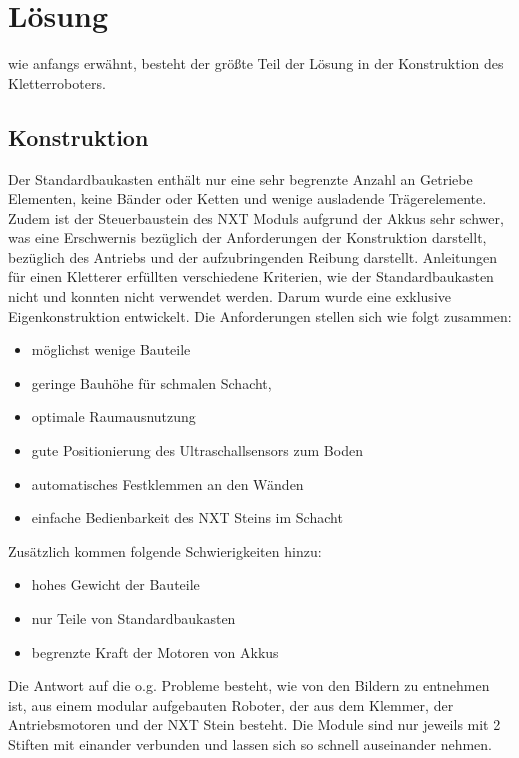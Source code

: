   \section{Lösung}
    wie anfangs erwähnt, besteht der größte Teil der Lösung in der Konstruktion des Kletterroboters.
    
    \subsection{Konstruktion}
      Der Standardbaukasten enthält nur eine sehr begrenzte Anzahl an Getriebe Elementen, keine Bänder oder Ketten und wenige ausladende Trägerelemente. Zudem ist der Steuerbaustein des NXT Moduls aufgrund der Akkus sehr schwer, was eine Erschwernis bezüglich der Anforderungen der Konstruktion darstellt, bezüglich des Antriebs und der aufzubringenden Reibung darstellt.
      \newline
      Anleitungen für einen Kletterer erfüllten verschiedene Kriterien, wie der Standardbaukasten nicht und konnten nicht verwendet werden. Darum wurde eine exklusive Eigenkonstruktion entwickelt.
      Die Anforderungen stellen sich wie folgt zusammen:
      
      \begin{itemize}
	\item möglichst wenige Bauteile
	\item geringe Bauhöhe für schmalen Schacht,
	\item optimale Raumausnutzung
	\item gute Positionierung des Ultraschallsensors zum Boden
	\item automatisches Festklemmen an den Wänden
	\item einfache Bedienbarkeit des NXT Steins im Schacht
      \end{itemize}
      
      Zusätzlich kommen folgende Schwierigkeiten hinzu:
      
      \begin{itemize}
       \item hohes Gewicht der Bauteile
       \item nur Teile von Standardbaukasten
       \item begrenzte Kraft der Motoren von Akkus
      \end{itemize}

      Die Antwort auf die o.g. Probleme besteht, wie von den Bildern zu entnehmen ist, aus einem modular aufgebauten Roboter, der aus dem Klemmer, der Antriebsmotoren und der NXT Stein besteht. Die Module sind nur jeweils mit 2 Stiften mit einander verbunden und lassen sich so schnell auseinander nehmen.
      
